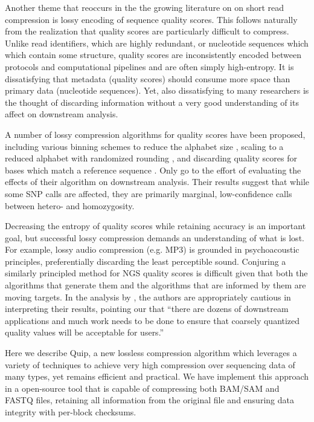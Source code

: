 \documentclass[twocolumn]{article}
\begin{document}

Another theme that reoccurs in the the growing literature on on short read
compression is lossy encoding of sequence quality scores. This follows
naturally from the realization that quality scores are particularly difficult
to compress. Unlike read identifiers, which are highly redundant, or
nucleotide sequences which which contain some structure, quality scores are
inconsistently encoded between protocols and computational pipelines and are
often simply high-entropy. It is dissatisfying that metadata (quality scores)
should consume more space than primary data (nucleotide sequences). Yet, also
dissatisfying to many researchers is the thought of discarding information
without a very good understanding of its affect on downstream analysis.

A number of lossy compression algorithms for quality scores have been
proposed, including various binning schemes to reduce the alphabet size
\citep{Wan2011}, scaling to a reduced alphabet with randomized rounding
\citep{Kozanitis2011}, and discarding quality scores for bases which match a
reference sequence \citep{Hsi-YangFritz2011}. Only \citet{Kozanitis2011} go to
the effort of evaluating the effects of their algorithm on downstream
analysis. Their results suggest that while some SNP calls are affected, they
are primarily marginal, low-confidence calls between hetero- and homozygosity.

Decreasing the entropy of quality scores while retaining accuracy is an
important goal, but successful lossy compression demands an understanding of
what is lost. For example, lossy audio compression (e.g. MP3) is grounded in
psychoacoustic principles, preferentially discarding the least perceptible
sound. Conjuring a similarly principled method for NGS quality scores is
difficult given that both the algorithms that generate them and the algorithms
that are informed by them are moving targets. In the analysis by
\citet{Kozanitis2011}, the authors are appropriately cautious in interpreting
their results, pointing our that ``there are dozens of downstream applications
and much work needs to be done to ensure that coarsely quantized quality
values will be acceptable for users.''



Here we describe Quip, a new lossless compression algorithm which leverages a
variety of techniques to achieve very high compression over sequencing data of
many types, yet remains efficient and practical. We have implement this
approach in a open-source tool that is capable of compressing both BAM/SAM and
FASTQ files, retaining all information from the original file and ensuring
data integrity with per-block checksums.
\end{document}
